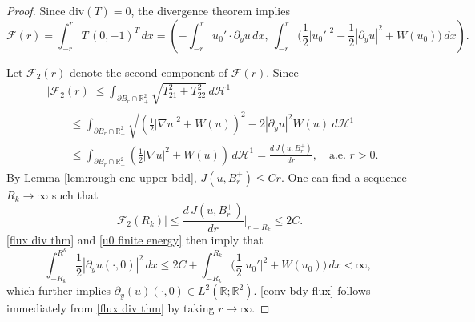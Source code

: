 \documentclass[leqno,11pt]{amsart}
\let\pa=\partial
\let\f=\frac
\let\pa=\partial
\let\na=\nabla
\theoremstyle{remark}
\newcommand{\BR}{\mathbb{R}}
\newcommand{\ch}{\mathcal{H}^1}
\begin{document}
\begin{proof}
    Since $\mathrm{div}(T)=0$, the divergence theorem implies 
    \begin{equation}\label{flux div thm}
        \mathcal{F}(r)=\int_{-r}^r T\,(0,-1)^T\,dx=\left(-\int_{-r}^r u_0'\cdot \pa_y u\,dx,\ \int_{-r}^r\big(\f12|u_0'|^2-\f12|\pa_y u|^2+W(u_0)\big)\,dx \right).
    \end{equation}

Let $\mathcal{F}_2(r)$ denote the second component of $\mathcal{F}(r)$. Since 
\begin{align*}
    &|\mathcal{F}_2(r)|\leq \int_{\pa B_r\cap\BR_+^2} \sqrt{T_{21}^2+T_{22}^2}\,d\ch\\
    &\qquad \leq \int_{\pa B_r\cap\BR_+^2} \sqrt{(\f12|\na u|^2+W(u))^2-2|\pa_y u|^2 W(u)}\,d\ch\\
    &\qquad \leq  \int_{\pa B_r\cap\BR_+^2} \left(\f12|\na u|^2+W(u)\right)\,d\ch = \f{d\, J(u,B_r^+)}{dr},\quad \text{a.e. }r>0.
\end{align*}
By Lemma \ref{lem:rough ene upper bdd}, $J(u,B_r^+)\leq Cr$. One can find a sequence $R_k\to\infty$ such that 
\[
|\mathcal{F}_2(R_k)|\leq \f{d\, J(u,B_{r}^+)}{dr}\big|_{r=R_k}\leq 2C. 
\]
\eqref{flux div thm} and \eqref{u0 finite energy} then imply that
\begin{equation*}
    \int_{-R_k}^{R^k} \f12|\pa_y u(\cdot,0)|^2\,dx \leq 2C+\int_{-R_k}^{R_k} \big(\f12|u_0'|^2+W(u_0)\big)\,dx<\infty,
\end{equation*}
which further implies $\pa_y(u)(\cdot,0)\in L^2(\BR;\BR^2)$. \eqref{conv bdy flux} follows immediately from \eqref{flux div thm} by taking $r\to\infty$. 


\end{proof}
\end{document}
